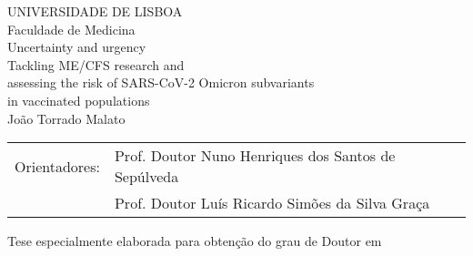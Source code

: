 \thispagestyle{empty}

\begin{center}
    {\FontMn UNIVERSIDADE DE LISBOA} \\
    {\FontMn Faculdade de Medicina} \\
    
    \vspace{1cm}
    {\FontLb Uncertainty and urgency} \\
    \vspace{0.1cm}
    {\FontMn Tackling ME/CFS research and\\assessing the risk of SARS-CoV-2 Omicron subvariants\\in vaccinated populations} \\

    \vspace{1cm}
    {\FontLb João Torrado Malato} \\
    
    \vspace{1cm}
    \begin{justify}
        {\FontSn %
        \begin{tabular}{m{} m{}}
            Orientadores:   & Prof. Doutor Nuno Henriques dos Santos de Sepúlveda \\
                            & Prof. Doutor Luís Ricardo Simões da Silva Graça
        \end{tabular}
        }
    \end{justify}
    
    \vspace{0.75cm}
    \begin{center}
    {\FontSn Tese especialmente elaborada para obtenção do grau de Doutor em {}}
    \end{center}


\end{center}
